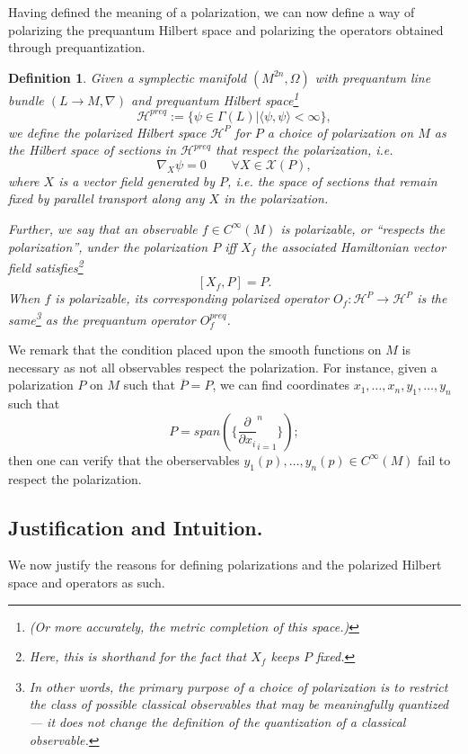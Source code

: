 \documentclass{tufte-handout}
\newtheorem{defn}{Definition}
\begin{document}
Having defined the meaning of a polarization, we can now define a way of polarizing the prequantum Hilbert space and polarizing the operators obtained through prequantization.
\begin{defn}
Given a symplectic manifold $(M^{2n},\Omega)$ with prequantum line bundle $(L \to M,\nabla)$ and prequantum Hilbert space\footnote{(Or more accurately, the metric completion of this space.)}
$$
\mathcal{H}^{preq} := \{\psi \in \Gamma(L) | \langle\psi,\psi\rangle < \infty \},
$$
we define the polarized Hilbert space $\mathcal{H}^{P}$ for $P$ a choice of polarization on $M$ as the Hilbert space of sections in $\mathcal{H}^{preq}$ that \emph{respect the polarization}, i.e.
$$
\nabla_X \psi = 0 \qquad \forall X \in \mathcal{X}(P),
$$
where $X$ is a vector field generated by $P$, i.e. the space of sections that remain fixed by parallel transport along any $X$ in the polarization.

Further, we say that an observable $f \in C^\infty(M)$ is \emph{polarizable}, or \emph{``respects the polarization''}, under the polarization $P$ iff $X_f$ the associated Hamiltonian vector field satisfies\footnote{Here, this is shorthand for the fact that $X_f$ keeps $P$ fixed.}
$$
[X_f,P] = P.
$$
When $f$ is polarizable, its corresponding \emph{polarized operator} $O_f: \mathcal{H}^{P} \to \mathcal{H}^{P}$ is the same\footnote{In other words, the primary purpose of a choice of polarization is to restrict the class of possible classical observables that may be meaningfully quantized --- it does not change the definition of the quantization of a classical observable.}
 as the prequantum operator $O^{preq}_f$.

\end{defn}

We remark that the condition placed upon the smooth functions on $M$ is necessary as not all observables respect the polarization. For instance, given a polarization $P$ on $M$ such that $\overline{P} = P$, we can find coordinates $x_1,\ldots,x_n,y_1,\ldots,y_n$ such that
$$
P = span(\{\frac{\partial}{\partial x_i}_{i=1}^n\});
$$
then one can verify that the oberservables $y_1(p),\ldots,y_n(p) \in C^\infty(M)$ fail to respect the polarization.

\subsection{Justification and Intuition.}
We now justify the reasons for defining polarizations and the polarized Hilbert space and operators as such.
\end{document}
